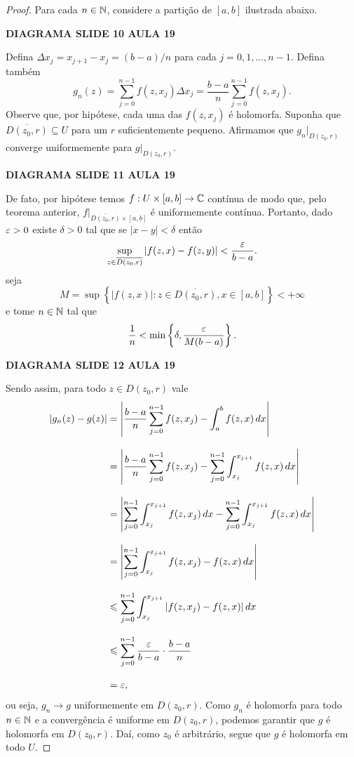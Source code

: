 %
\begin{proof}
Para cada $n\in\mathbb{N}$, considere a partição de $[a,b]$ ilustrada abaixo.
%
\begin{center}
    {\bf DIAGRAMA SLIDE 10 AULA 19}
\end{center}
%
Defina $\Delta x_j = x_{j+1} - x_j = (b-a)/n$ para cada $j = 0, 1, \dots, n-1$.
Defina também
%
\[
g_n(z) = \sum_{j=0}^{n-1} f(z, x_j)\Delta x_j = \frac{b-a}{n}\sum_{j=0}^{n-1} f(z, x_j).
\]
%
Observe que, por hipótese, cada uma das $f(z, x_j)$ é holomorfa. Suponha que 
$\overline{D(z_0,r)} \subseteq U$ para um $r$ suficientemente pequeno. Afirmamos que
$g_n\big|_{D(z_0, r)}$ converge uniformemente para $g\big|_{D(z_0, r)}$.
%
\begin{center}
    {\bf DIAGRAMA SLIDE 11 AULA 19}
\end{center}
%
De fato, por hipótese temos $f:U\times[a,b]\to\mathbb{C}$ contínua de modo que, pelo teorema anterior,
$f\big|_{\overline{D(z_0, r)} \times [a,b]}$ é uniformemente contínua. Portanto, dado $\varepsilon>0$
existe $\delta > 0$ tal que se $|x - y| < \delta$ então
%
\[
\sup_{z\in\overline{D(z_0,r)}} |f(z,x) - f(z,y)| < \frac{\varepsilon}{b-a}.
\]
%
seja
%
\[
M = \sup\left\{ |f(z,x)| : z\in\overline{D(z_0,r)}, x\in[a,b] \right\} < +\infty
\]
%
e tome $n\in\mathbb{N}$ tal que
%
\[
\frac{1}{n} < \min\left\{ \delta, \frac{\varepsilon}{M(b-a)} \right\}.
\]
%
\begin{center}
    {\bf DIAGRAMA SLIDE 12 AULA 19}
\end{center}
%
Sendo assim, para todo $z\in D(z_0, r)$ vale
%
\begin{align*}
    |g_n(z) - g(z)| &= \left| \frac{b-a}{n}\sum_{j=0}^{n-1} f(z,x_j) 
                    - \int_a^b f(z,x) \, dx \right| \\[0.3cm]
                    &= \left| \frac{b-a}{n}\sum_{j=0}^{n-1} f(z,x_j) 
                    - \sum_{j=0}^{n-1}\int_{x_j}^{x_{j+1}} f(z,x) \, dx \right| \\[0.3cm]
                    &= \left| \sum_{j=0}^{n-1}\int_{x_j}^{x_{j+1}} f(z,x_j) \, dx
                    - \sum_{j=0}^{n-1}\int_{x_j}^{x_{j+1}} f(z,x) \, dx \right| \\[0.3cm]
                    &= \left| \sum_{j=0}^{n-1}\int_{x_j}^{x_{j+1}} f(z,x_j) - f(z,x) \, dx 
                    \right| \\[0.3cm]
                    &\leqslant \sum_{j=0}^{n-1}\int_{x_j}^{x_{j+1}} |f(z,x_j) - f(z,x)| \, dx \\[0.3cm]
                    &\leqslant \sum_{j=0}^{n-1} \frac{\varepsilon}{b-a}\cdot\frac{b-a}{n} \\[0.3cm]
                    &= \varepsilon,
\end{align*}
%
ou seja, $g_n\to g$ uniformemente em $D(z_0,r)$. Como $g_n$ é holomorfa para todo $n\in\mathbb{N}$
e a convergência é uniforme em $D(z_0,r)$, podemos garantir que $g$ é holomorfa em $D(z_0,r)$.
Daí, como $z_0$ é arbitrário, segue que $g$ é holomorfa em todo $U$.
\end{proof}
